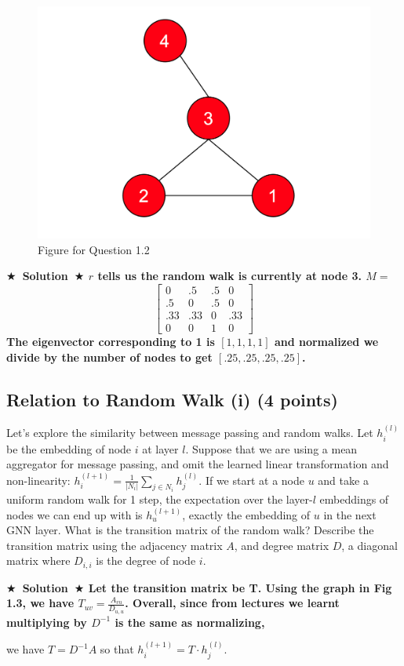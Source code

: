 \documentclass{article}
\numberwithin{figure}{section}
\newcommand{\Solution}[1]{{\medskip \color{red} \bf $\bigstar$~\sf \textbf{Solution}~$\bigstar$ \sf #1 } \bigskip}
\begin{document}
\begin{figure}[!htb]
\centering
  \includegraphics[width=0.5\columnwidth]{CS224W_Homework1/fig4-2.png}
  \caption{Figure for Question 1.2}
  \label{fig:Q4.2}
\end{figure}

\Solution{$r$ tells us the random walk is currently at node 3. $M =$ 
\[
\begin{bmatrix}
  0 & .5 & .5 & 0 \\
  .5 & 0 & .5 & 0 \\
  .33 & .33 & 0 & .33 \\
  0 & 0 & 1 & 0
\end{bmatrix}
\]
The eigenvector corresponding to 1 is $[1,1,1,1]$ and normalized we divide by the number of nodes to get $[.25,.25,.25,.25]$.}



\subsection{Relation to Random Walk (i) (4 points)}

Let’s explore the similarity between message passing and random walks. Let $h^{(l)}_i$ be the embedding of node $i$ at layer $l$. Suppose that we are using a mean aggregator for message passing, and omit the learned linear transformation and non-linearity: $h^{(l+1)}_i = \frac{1}{|N_i|} \sum_{j \in N_i} h^{(l)}_j$. If we start at a node $u$ and take a uniform random walk for 1 step, the expectation over the layer-$l$ embeddings
of nodes we can end up with is $h^{(l+1)}_u$, exactly the embedding of $u$ in the next GNN layer. What is the transition matrix of the random walk? Describe the transition matrix using the adjacency matrix $A$, and degree matrix $D$, a diagonal matrix where $D_{i,i}$ is the degree of node $i$.

\Solution{Let the transition matrix be T. Using the graph in Fig 1.3, we have $T_{uv}=\frac{A_{vu}}{D_{u,u}}$. 
Overall, since from lectures we learnt multiplying by $D^{-1}$ is the same as normalizing, 

we have $T=D^{-1}A$ so that $h^{(l+1)}_i = T \cdot h^{(l)}_j$.}
\end{document}
